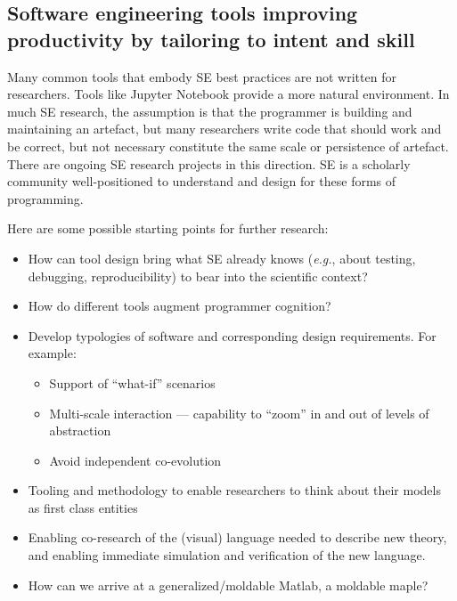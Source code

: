 \documentclass[a4paper,UKenglish]{dagman}
\newcommand{\eg}{\emph{e.g.},\xspace}
\begin{document}


\subsection{Software engineering tools improving productivity by tailoring to intent and skill}

Many common tools that embody SE best practices are not written for researchers. Tools like Jupyter Notebook provide a more natural environment. In much SE research, the assumption is that the programmer is building and maintaining an artefact, but many researchers write code that should work and be correct, but not necessary constitute the same scale or persistence of artefact. There are ongoing SE research projects in this direction. SE is a scholarly community well-positioned to understand and design for these forms of programming.

Here are some possible starting points for further research:

\begin{itemize}
\item How can tool design bring what SE already knows (\eg about testing, debugging, reproducibility) to bear into the scientific context?
\item How do different tools augment programmer cognition?
\item Develop typologies of software and corresponding design requirements. For example:
    \begin{itemize}
    \item Support of ``what-if'' scenarios
    \item Multi-scale interaction --- capability to ``zoom'' in and out of levels of abstraction
    \item Avoid independent co-evolution
    \end{itemize}
\item Tooling and methodology to enable researchers to think about their models as first class entities
\item Enabling co-research of the (visual) language needed to describe new theory, and enabling immediate simulation and verification of the new language.
\item How can we arrive at a generalized/moldable Matlab, a moldable maple?
\end{itemize}
\end{document}
